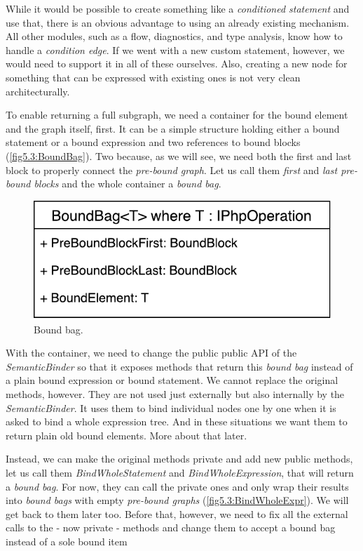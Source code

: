 While it would be possible to create something like a \emph{conditioned statement} and use that, there is an obvious advantage to using an already existing mechanism. All other modules, such as a flow, diagnostics, and type analysis, know how to handle a \emph{condition edge}. If we went with a new custom statement, however, we would need to support it in all of these ourselves. Also, creating a new node for something that can be expressed with existing ones is not very clean architecturally.

To enable returning a full subgraph, we need a container for the bound element and the graph itself, first. It can be a simple structure holding either a bound statement or a bound expression and two references to bound blocks (\autoref{fig5.3:BoundBag}). Two because, as we will see, we need both the first and last block to properly connect the \emph{pre-bound graph}. Let us call them \emph{first} and \emph{last pre-bound blocks} and the whole container a \emph{bound bag}.

\begin{figure}[H]
	\centering	
	\includegraphics[scale=0.75]{../img/5_3_BoundBag}	
	\caption{Bound bag.}
	\label{fig5.3:BoundBag}
\end{figure}

With the container, we need to change the public public API of the \emph{SemanticBinder} so that it exposes methods that return this \emph{bound bag} instead of a plain bound expression or bound statement. We cannot replace the original methods, however. They are not used just externally but also internally by the \emph{SemanticBinder}. It uses them to bind individual nodes one by one when it is asked to bind a whole expression tree. And in these situations we want them to return plain old bound elements. More about that later.

Instead, we can make the original methods private and add new public methods, let us call them \emph{BindWholeStatement} and \emph{BindWholeExpression}, that will return a \emph{bound bag}. For now, they can call the private ones and only wrap their results into \emph{bound bags} with empty \emph{pre-bound graphs} (\autoref{fig5.3:BindWholeExpr}). We will get back to them later too. Before that, however, we need to fix all the external calls to the - now private - methods and change them to accept a bound bag instead of a sole bound item

